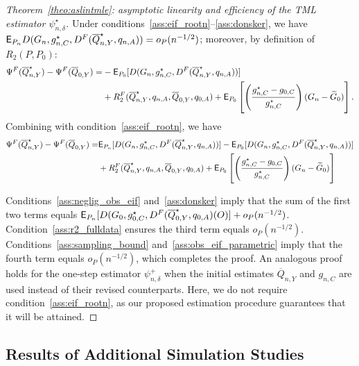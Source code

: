 \begin{proof}[Theorem~\ref{theo:aslintmle}: asymptotic linearity and
efficiency of the TML estimator $\psi_{n,\delta}^{\star}$]\label{pf:aslintmle}
Under conditions~\ref{ass:eif_rootn}--\ref{ass:donsker}, we have $\mathsf{E}_{P_n}
D(G_n, g^{\star}_{n,C}, D^F(\overline{Q}^{\star}_{n,Y},q_{n,A})) =
o_P(n^{-1/2})$; moreover, by definition of $R_2(P, P_0)$:
\begin{align*}
  \Psi^F(\overline{Q}^{\star}_{n,Y}) - \Psi^F(\overline{Q}_{0,Y}) =
   &-\mathsf{E}_{P_0} [D(G_n, g^{\star}_{n,C},
      D^F(\overline{Q}^{\star}_{n,Y}, q_{n,A}))] \\
   &+ R^F_2(\overline{Q}^{\star}_{n,Y}, q_{n,A}, \overline{Q}_{0,Y}, q_{0,A})
  + \mathsf{E}_{P_0} \left[ \left( \frac{g^{\star}_{n,C} - g_{0,C}}
   {g^{\star}_{n,C}} \right) (G_n - \widetilde{G}_0)\right].
\end{align*}
Combining with condition~\ref{ass:eif_rootn}, we have
\begin{align*}
  \Psi^F(\overline{Q}^{\star}_{n,Y}) - \Psi^F(\overline{Q}_{0,Y}) =
  & \mathsf{E}_{P_n}[D(G_n, g^{\star}_{n,C}, D^F(\overline{Q}^{\star}_{n,Y}, q_{n,A}))]
  - \mathsf{E}_{P_0}[D(G_n, g^{\star}_{n,C}, D^F(\overline{Q}^{\star}_{n,Y},
  q_{n,A}))] \\
  &+ R^F_2(\overline{Q}^{\star}_{n,Y}, q_{n,A}, \overline{Q}_{0,Y}, q_{0,A}) +
  \mathsf{E}_{P_0} \left[ \left( \frac{g^{\star}_{n,C} - g_{0,C}}{g^{\star}_{n,C}}
  \right) (G_n - \widetilde{G}_0) \right]
\end{align*}

Conditions~\ref{ass:neglig_obs_eif} and~\ref{ass:donsker} imply that the sum of
the first two terms equals $\mathsf{E}_{P_n}[D(G_0, g^{\star}_{0,C},
D^F(\overline{Q}^{\star}_{0,Y}, q_{0,A})(O)] + o_{P}(n^{-1/2})$.
Condition~\ref{ass:r2_fulldata} ensures the third term equals $o_{P}(n^{-1/2})$.
Conditions~\ref{ass:sampling_bound} and~\ref{ass:obs_eif_parametric} imply that
the fourth term equals $o_P(n^{-1/2})$, which completes the proof. An analogous
proof holds for the one-step estimator $\psi_{n,\delta}^{+}$ when the initial
estimates $\overline{Q}_{n,Y}$ and $g_{n,C}$ are used instead of their revised
counterparts. Here, we do not require condition~\ref{ass:eif_rootn}, as our
proposed estimation procedure guarantees that it will be attained.
\end{proof}

\subsection{Results of Additional Simulation Studies}\label{more_sims}

